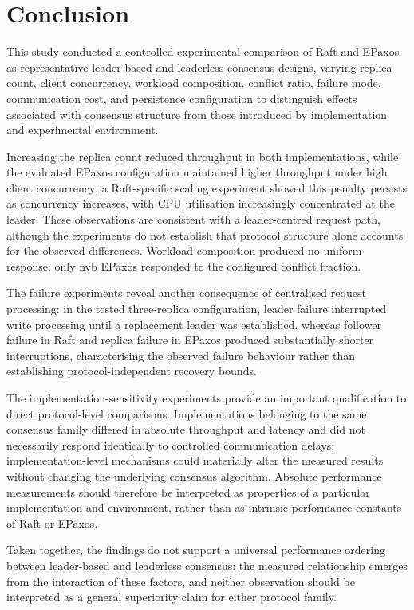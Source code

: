 \section{Conclusion}

\label{sec:conclusion}

This study conducted a controlled experimental comparison of Raft and EPaxos as representative leader-based and leaderless consensus designs, varying replica count, client concurrency, workload composition, conflict ratio, failure mode, communication cost, and persistence configuration to distinguish effects associated with consensus structure from those introduced by implementation and experimental environment.

Increasing the replica count reduced throughput in both implementations, while the evaluated EPaxos configuration maintained higher throughput under high client concurrency; a Raft-specific scaling experiment showed this penalty persists as concurrency increases, with CPU utilisation increasingly concentrated at the leader. These observations are consistent with a leader-centred request path, although the experiments do not establish that protocol structure alone accounts for the observed differences. Workload composition produced no uniform response: only nvb EPaxos responded to the configured conflict fraction.

The failure experiments reveal another consequence of centralised request processing: in the tested three-replica configuration, leader failure interrupted write processing until a replacement leader was established, whereas follower failure in Raft and replica failure in EPaxos produced substantially shorter interruptions, characterising the observed failure behaviour rather than establishing protocol-independent recovery bounds.

The implementation-sensitivity experiments provide an important qualification to direct protocol-level comparisons. Implementations belonging to the same consensus family differed in absolute throughput and latency and did not necessarily respond identically to controlled communication delays; implementation-level mechanisms could materially alter the measured results without changing the underlying consensus algorithm. Absolute performance measurements should therefore be interpreted as properties of a particular implementation and environment, rather than as intrinsic performance constants of Raft or EPaxos.

Taken together, the findings do not support a universal performance ordering between leader-based and leaderless consensus: the measured relationship emerges from the interaction of these factors, and neither observation should be interpreted as a general superiority claim for either protocol family.

